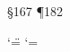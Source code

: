 
\encode{}	%
\encode{}	%
\encode\S{167}		%
\encode\P{182}		%














\catcode`\"=\qqcode@
\catcode`\@=\atcode@
